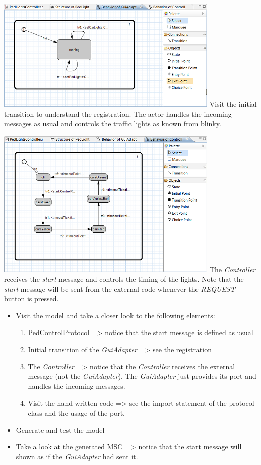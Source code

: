 \includegraphics[width=0.8\textwidth]{images/030-PedLights02.png}
Visit the initial transition to understand the registration. The actor handles the incoming messages as usual and controls the traffic lights as known from blinky. 

\includegraphics[width=0.8\textwidth]{images/030-PedLights03.png}
The \textit{Controller} receives the \textit{start} message and controls the timing of the lights. Note that the \textit{start} message will be sent from the external code whenever the \textit{REQUEST} button is pressed.

\begin{itemize}
\item  Visit the model and take a closer look to the following elements:
\begin{enumerate}
\item PedControlProtocol => notice that the start message is defined as usual
\item Initial transition of the \textit{GuiAdapter} => see the registration
\item The \textit{Controller} => notice that the \textit{Controller} receives the external message (not the \textit{GuiAdapter}). The \textit{GuiAdapter} just provides its port and handles the incoming messages.
\item Visit the hand written code => see the import statement of the protocol class and the usage of the port.
\end{enumerate}
\item Generate and test the model
\item Take a look at the generated MSC => notice that the start message will shown as if the \textit{GuiAdapter} had sent it.
\end{itemize}

